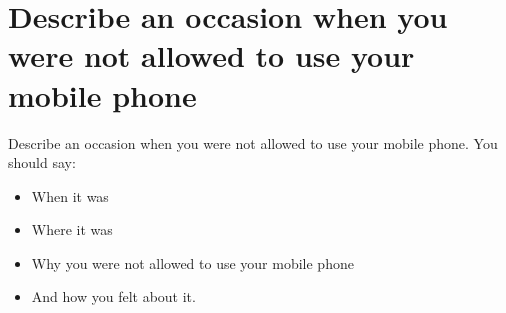 \section{Describe an occasion when you were not allowed to use your mobile phone}
\begin{ieltsprompt}
Describe an occasion when you were not allowed to use your mobile phone.
You should say:
\begin{itemize}[leftmargin=2em, itemsep=2pt]
\item When it was
\item Where it was
\item Why you were not allowed to use your mobile phone
\item And how you felt about it.
\end{itemize}
\end{ieltsprompt}
